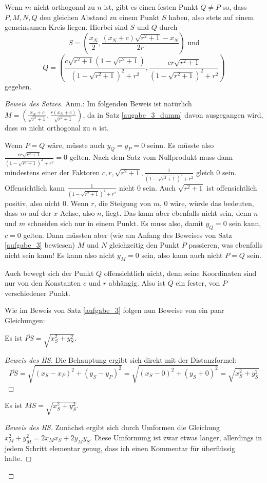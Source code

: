 \begin{thm}\label{augabe_3_dumm}
    Wenn $m$ nicht orthogonal zu $n$ ist, gibt es einen festen Punkt $Q\neq P$ so, dass $P, M, N, Q$ 
    den gleichen Abstand zu einem Punkt $S$ haben, also stets auf einem gemeinsamen Kreis liegen. 
    Hierbei sind $S$ und $Q$ durch
    \[
    S=\left(\frac{x_N}{2},\frac{(x_N+c)\sqrt{r^2+1}-x_N}{2r}\right)\text{ und}
    \]
    \[
    Q=\left(\frac{c\sqrt{r^2+1}\left(1-\sqrt{r^2+1}\right)}{\left(1-\sqrt{r^2+1}\right)^2+r^2}, 
    \frac{cr\sqrt{r^2+1}}{\left(1-\sqrt{r^2+1}\right)^2+r^2}\right)
    \]
    gegeben.
\end{thm}
\begin{proof}[Beweis des Satzes]
    \renewcommand{\qedsymbol}{$\square$}
    Anm.: Im folgenden Beweis ist natürlich $M=\left( \frac{x_N+c}{\sqrt{r^2+1}} , \frac{r(x_N+c)}{\sqrt{r^2+1}} 
    \right)$, da in Satz \ref{augabe_3_dumm} davon ausgegangen wird, dass $m$ nicht orthogonal zu $n$ ist.

    Wenn $P=Q$ wäre, müsste auch $y_Q=y_P=0$ seinn. Es müsste also $\frac{cr\sqrt{r^2+1}}{(1-\sqrt{r^2+1})^2+r^2}
    =0$ gelten. Nach dem Satz vom Nullprodukt muss dann mindestens einer der Faktoren $c, r, \sqrt{r^2+1}, 
    \frac{1}{(1-\sqrt{r^2+1})^2+r^2}$ gleich 0 sein. Offensichtlich kann $\frac{1}{(1-\sqrt{r^2+1})^2+r^2}$ nicht 0 
    sein. Auch $\sqrt{r^2+1}$ ist offensichtlich positiv, also nicht 0. Wenn $r$, die Steigung von $m$, 0 wäre, 
    würde das bedeuten, dass $m$ auf der $x$-Achse, also $n$, liegt. Das kann aber ebenfalls nicht sein, denn $n$ 
    und $m$ schneiden sich nur in einem Punkt. Es muss also, damit $y_Q=0$ sein kann, $c=0$ gelten. Dann müssten 
    aber (wie am Anfang des Beweises von Satz \ref{aufgabe_3} bewiesen) $M$ und $N$ gleichzeitig den Punkt $P$ 
    passieren, was ebenfalls nicht sein kann! Es kann also nicht $y_M=0$ sein, also kann auch nicht $P=Q$ sein.

    Auch bewegt sich der Punkt $Q$ offensichtlich nicht, denn seine Koordinaten sind nur von den Konstanten $c$ und 
    $r$ abhängig. Also ist $Q$ ein fester, von $P$ verschiedener Punkt.

    Wie im Beweis von Satz \ref{aufgabe_3} folgen nun Beweise von ein paar Gleichungen:
    \begin{lem}\label{dumm_P}
        Es ist $\overline{PS}=\sqrt{x_S^2+y_S^2}$.
    \end{lem}
    \begin{proof}[Beweis des HS]
        Die Behauptung ergibt sich direkt mit der Distanzformel:
        \[
        \overline{PS}=\sqrt{(x_S-x_P)^2+(y_S-y_P)^2}=\sqrt{(x_S-0)^2+(y_S+0)^2}=\sqrt{x_S^2+y_S^2}    
        \]
    \end{proof}
    \begin{lem}\label{dumm_M}
        Es ist $\overline{MS}=\sqrt{x_S^2+y_S^2}$.
    \end{lem}
    \begin{proof}[Beweis des HS]
        Zunächst ergibt sich durch Umformen die Gleichung $x_M^2+y_M^2=2x_Mx_S+2y_My_S$. Diese Umformung ist 
        zwar etwas länger, allerdings in jedem Schritt elementar genug, dass ich einen Kommentar für überflüssig 
        halte.


\end{proof}
\end{proof}
